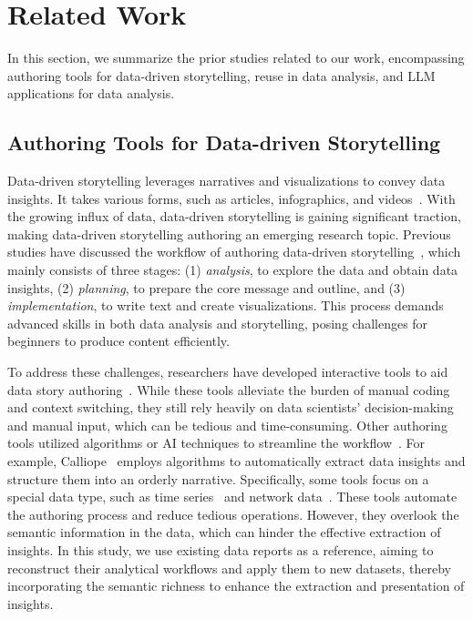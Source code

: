 \section{Related Work}

In this section, we summarize the prior studies related to our work, encompassing authoring tools for data-driven storytelling, reuse in data analysis, and LLM applications for data analysis.

\subsection{Authoring Tools for Data-driven Storytelling}

Data-driven storytelling leverages narratives and visualizations to convey data insights. 
It takes various forms, such as articles, infographics, and videos~\cite{segel2010narrative, masry2022chartqa, kang2021toonnote}.
With the growing influx of data, data-driven storytelling is gaining significant traction, making data-driven storytelling authoring an emerging research topic. 
Previous studies have discussed the workflow of authoring data-driven storytelling~\cite{li2023wherearewesofar}, which mainly consists of three stages: 
(1) \textit{analysis}, to explore the data and obtain data insights, 
(2) \textit{planning}, to prepare the core message and outline, and
(3) \textit{implementation}, to write text and create visualizations. 
This process demands advanced skills in both data analysis and storytelling, posing challenges for beginners to produce content efficiently.

To address these challenges,  researchers have developed interactive tools to aid data story authoring~\cite{kim2019datatoon}. 
While these tools alleviate the burden of manual coding and context switching, they still rely heavily on data scientists' decision-making and manual input, which can be tedious and time-consuming. 
Other authoring tools utilized algorithms or AI techniques to streamline the workflow~\cite{wang2019datashot, lu2021scrollytelling}. 
For example, Calliope~\cite{shi2020calliope} employs algorithms to automatically extract data insights and structure them into an orderly narrative. 
Specifically, some tools focus on a special data type, such as time series~\cite{shin2022roslingifier} and network data~\cite{chen2023calliopeNet}. 
These tools automate the authoring process and reduce tedious operations. 
However, they overlook the semantic information in the data, which can hinder the effective extraction of insights. 
In this study, we use existing data reports as a reference, aiming to reconstruct their analytical workflows and apply them to new datasets, thereby incorporating the semantic richness to enhance the extraction and presentation of insights.

